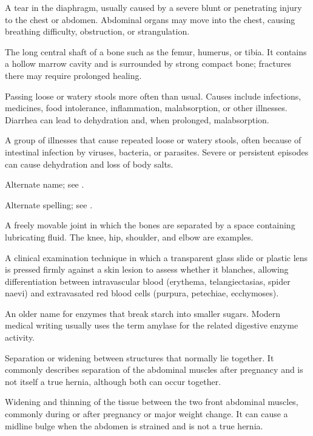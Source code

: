  A tear in the diaphragm, usually caused by a severe blunt or penetrating injury to the chest or abdomen. Abdominal organs may move into the chest, causing breathing difficulty, obstruction, or strangulation.

 The long central shaft of a bone such as the femur, humerus, or tibia. It contains a hollow marrow cavity and is surrounded by strong compact bone; fractures there may require prolonged healing.

 Passing loose or watery stools more often than usual. Causes include infections, medicines, food intolerance, inflammation, malabsorption, or other illnesses. Diarrhea can lead to dehydration and, when prolonged, malabsorption.

 A group of illnesses that cause repeated loose or watery stools, often because of intestinal infection by viruses, bacteria, or parasites. Severe or persistent episodes can cause dehydration and loss of body salts.

 Alternate name; see .

 Alternate spelling; see .

 A freely movable joint in which the bones are separated by a space containing lubricating fluid. The knee, hip, shoulder, and elbow are examples.

 A clinical examination technique in which a transparent glass slide or plastic lens is pressed firmly against a skin lesion to assess whether it blanches, allowing differentiation between intravascular blood (erythema, telangiectasias, spider naevi) and extravasated red blood cells (purpura, petechiae, ecchymoses).

 An older name for enzymes that break starch into smaller sugars. Modern medical writing usually uses the term amylase for the related digestive enzyme activity.

 Separation or widening between structures that normally lie together. It commonly describes separation of the abdominal muscles after pregnancy and is not itself a true hernia, although both can occur together.

 Widening and thinning of the tissue between the two front abdominal muscles, commonly during or after pregnancy or major weight change. It can cause a midline bulge when the abdomen is strained and is not a true hernia.

